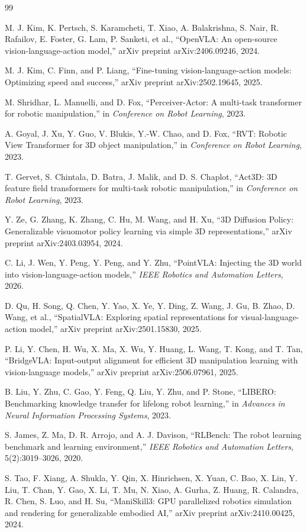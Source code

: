 \documentclass[conference]{IEEEtran}
\begin{document}
\begin{thebibliography}{99}

M. J. Kim, K. Pertsch, S. Karamcheti, T. Xiao, A. Balakrishna, S. Nair, R. Rafailov, E. Foster, G. Lam, P. Sanketi, et al., ``OpenVLA: An open-source vision-language-action model,'' arXiv preprint arXiv:2406.09246, 2024.

M. J. Kim, C. Finn, and P. Liang, ``Fine-tuning vision-language-action models: Optimizing speed and success,'' arXiv preprint arXiv:2502.19645, 2025.

M. Shridhar, L. Manuelli, and D. Fox, ``Perceiver-Actor: A multi-task transformer for robotic manipulation,'' in \emph{Conference on Robot Learning}, 2023.

A. Goyal, J. Xu, Y. Guo, V. Blukis, Y.-W. Chao, and D. Fox, ``RVT: Robotic View Transformer for 3D object manipulation,'' in \emph{Conference on Robot Learning}, 2023.

T. Gervet, S. Chintala, D. Batra, J. Malik, and D. S. Chaplot, ``Act3D: 3D feature field transformers for multi-task robotic manipulation,'' in \emph{Conference on Robot Learning}, 2023.

Y. Ze, G. Zhang, K. Zhang, C. Hu, M. Wang, and H. Xu, ``3D Diffusion Policy: Generalizable visuomotor policy learning via simple 3D representations,'' arXiv preprint arXiv:2403.03954, 2024.

C. Li, J. Wen, Y. Peng, Y. Peng, and Y. Zhu, ``PointVLA: Injecting the 3D world into vision-language-action models,'' \emph{IEEE Robotics and Automation Letters}, 2026.

D. Qu, H. Song, Q. Chen, Y. Yao, X. Ye, Y. Ding, Z. Wang, J. Gu, B. Zhao, D. Wang, et al., ``SpatialVLA: Exploring spatial representations for visual-language-action model,'' arXiv preprint arXiv:2501.15830, 2025.

P. Li, Y. Chen, H. Wu, X. Ma, X. Wu, Y. Huang, L. Wang, T. Kong, and T. Tan, ``BridgeVLA: Input-output alignment for efficient 3D manipulation learning with vision-language models,'' arXiv preprint arXiv:2506.07961, 2025.

B. Liu, Y. Zhu, C. Gao, Y. Feng, Q. Liu, Y. Zhu, and P. Stone, ``LIBERO: Benchmarking knowledge transfer for lifelong robot learning,'' in \emph{Advances in Neural Information Processing Systems}, 2023.

S. James, Z. Ma, D. R. Arrojo, and A. J. Davison, ``RLBench: The robot learning benchmark and learning environment,'' \emph{IEEE Robotics and Automation Letters}, 5(2):3019--3026, 2020.

S. Tao, F. Xiang, A. Shukla, Y. Qin, X. Hinrichsen, X. Yuan, C. Bao, X. Lin, Y. Liu, T. Chan, Y. Gao, X. Li, T. Mu, N. Xiao, A. Gurha, Z. Huang, R. Calandra, R. Chen, S. Luo, and H. Su, ``ManiSkill3: GPU parallelized robotics simulation and rendering for generalizable embodied AI,'' arXiv preprint arXiv:2410.00425, 2024.

\end{thebibliography}
\end{document}
